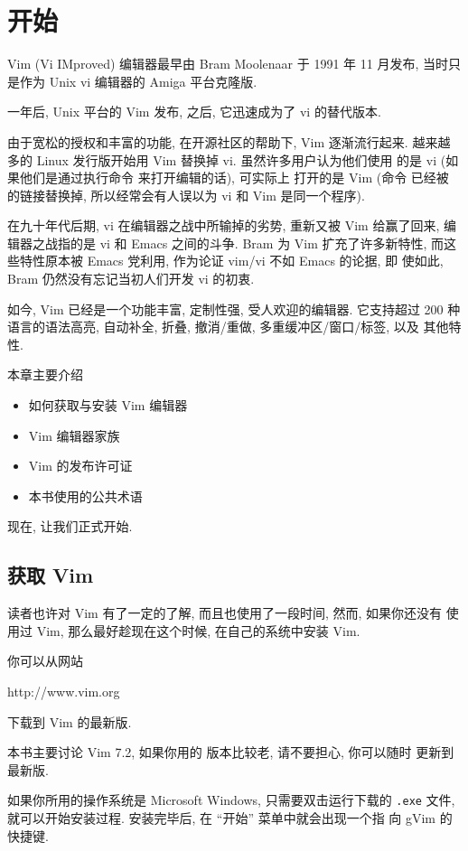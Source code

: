 \chapter{开始}
\label{chap:getting_started_with_vim}

Vim (Vi IMproved) 编辑器最早由 Bram Moolenaar 于 1991 年 11 月发布,
当时只是作为 Unix vi 编辑器的 Amiga 平台克隆版.

一年后, Unix 平台的 Vim 发布, 之后, 它迅速成为了 vi 的替代版本.

由于宽松的授权和丰富的功能, 在开源社区的帮助下, Vim 逐渐流行起来.
越来越多的 Linux 发行版开始用 Vim 替换掉 vi. 虽然许多用户认为他们使用
的是 vi (如果他们是通过执行命令 \vi 来打开编辑的话), 可实际上
打开的是 Vim (命令 \vi 已经被 \vim 的链接替换掉, 所以经常会有人误以为
vi 和 Vim 是同一个程序).

在九十年代后期, vi 在编辑器之战中所输掉的劣势, 重新又被 Vim 给赢了回来,
编辑器之战指的是 vi 和 Emacs 之间的斗争. Bram 为 Vim 扩充了许多新特性, 
而这些特性原本被  Emacs 党利用, 作为论证 vim/vi 不如 Emacs 的论据, 即
使如此, Bram 仍然没有忘记当初人们开发 vi 的初衷.

如今, Vim 已经是一个功能丰富, 定制性强, 受人欢迎的编辑器. 它支持超过 200 
种语言的语法高亮, 自动补全, 折叠, 撤消/重做, 多重缓冲区/窗口/标签, 以及
其他特性.

本章主要介绍
\begin{itemize}
    \item 如何获取与安装 Vim 编辑器
    \item Vim 编辑器家族
    \item Vim 的发布许可证 
    \item 本书使用的公共术语
\end{itemize}
现在, 让我们正式开始.

\section{获取 Vim}
\label{sec:getting_vim}

读者也许对 Vim 有了一定的了解, 而且也使用了一段时间, 然而, 如果你还没有
使用过 Vim, 那么最好趁现在这个时候, 在自己的系统中安装 Vim.

你可以从网站
\begin{gencode}
http://www.vim.org
\end{gencode}
下载到 Vim 的最新版.
\begin{waring}
本书主要讨论 Vim 7.2, 如果你用的 版本比较老, 请不要担心, 你可以随时
更新到最新版.
\end{waring}
如果你所用的操作系统是 Microsoft Windows, 只需要双击运行下载的 \texttt{.exe}
文件, 就可以开始安装过程. 安装完毕后, 在 ``开始'' 菜单中就会出现一个指
向 gVim 的快捷键.

